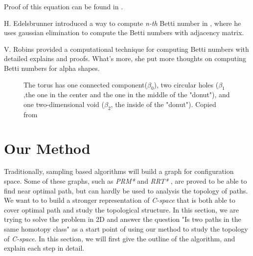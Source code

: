 \documentclass[11pt]{article}
\begin{document}
\indent Proof of this equation can be found in \cite{cyclomatic}.

\indent H. Edelsbrunner introduced a way to compute \emph{n-th} Betti number in \cite{Edel Book}, where he uses gaussian elimination to compute the Betti numbers with adjacency matrix.

\indent V. Robins \cite{alpha betti} provided a computational technique for computing Betti numbers with detailed explains and proofs. What's more, she put more thoughts on computing Betti numbers for alpha shapes.

\begin{figure}
	\caption{\label{fig:Torus} The torus has one connected component($\beta_0$), two circular holes ($\beta_1$,the one in the center and the one in the middle of the "donut"), and one two-dimensional void ($\beta_2$, the inside of the "donut"). Copied from \cite{betti wiki}}
\end{figure}


%

\section{Our Method}\label{method} 

\indent \indent Traditionally, sampling based algorithms will build a graph for configuration space. Some of these graphs, such as \emph{PRM*} and \emph{RRT*} \cite{prmstar}, are proved to be able to find near optimal path, but can hardly be used to analysis the topology of paths. We want to to build a stronger representation of \emph{C-space} that is both able to cover optimal path and study the topological structure. In this section, we are trying to solve the problem in 2D and answer the question "Is two paths in the same homotopy class" as a start point of using our method to study the topology of \emph{C-space}. In this section, we will first give the outline of the algorithm, and explain each step in detail. 
\end{document}
